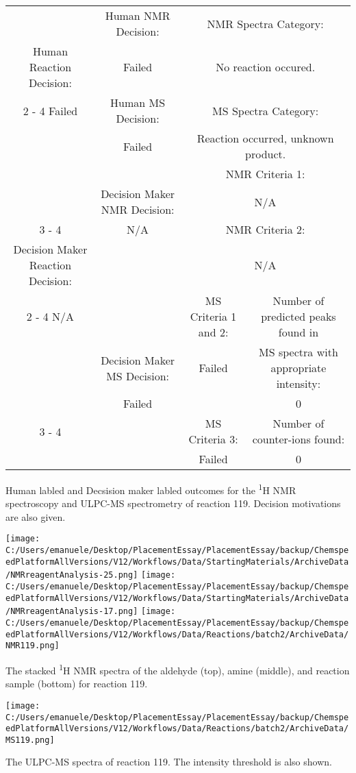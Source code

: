 \documentclass{article}%
\begin{document}
\begin{Decision Table}[H]%
\begin{tabular}{|c|c|c|c|}%
\hline%
&Human NMR Decision:&\multicolumn{2}{|c|}{NMR Spectra Category:}\\%
Human Reaction Decision:&Failed&\multicolumn{2}{|c|}{No reaction occured.}\\%
\cline{2%
-%
4}%
Failed&Human MS Decision:&\multicolumn{2}{|c|}{MS Spectra Category:}\\%
&Failed&\multicolumn{2}{|c|}{Reaction occurred, unknown product.}\\%
\hline%
&&\multicolumn{2}{|c|}{NMR Criteria 1:}\\%
&Decision Maker NMR Decision:&\multicolumn{2}{|c|}{N/A}\\%
\cline{3%
-%
4}%
&N/A&\multicolumn{2}{|c|}{NMR Criteria 2:}\\%
Decision Maker Reaction Decision:&&\multicolumn{2}{|c|}{N/A}\\%
\cline{2%
-%
4}%
N/A&&MS Criteria 1 and 2:&Number of predicted peaks found in\\%
&Decision Maker MS Decision:&Failed&MS spectra with appropriate intensity:\\%
&Failed&&0\\%
\cline{3%
-%
4}%
&&MS Criteria 3:&Number of counter{-}ions found:\\%
&&Failed&0\\%
\hline%
\end{tabular}%
\caption{Human labled and Decsision maker labled outcomes for the \textsuperscript{1}H NMR spectroscopy and ULPC-MS spectrometry of reaction 119. Decision motivations are also given.}%
\end{Decision Table}%
\begin{NMR Spectra}[H]%
\begin{center}%
\texttt{[image: C:/Users/emanuele/Desktop/PlacementEssay/PlacementEssay/backup/ChemspeedPlatformAllVersions/V12/Workflows/Data/StartingMaterials/ArchiveData/NMRreagentAnalysis-25.png]}\hfill%
\texttt{[image: C:/Users/emanuele/Desktop/PlacementEssay/PlacementEssay/backup/ChemspeedPlatformAllVersions/V12/Workflows/Data/StartingMaterials/ArchiveData/NMRreagentAnalysis-17.png]}\hfill%
\texttt{[image: C:/Users/emanuele/Desktop/PlacementEssay/PlacementEssay/backup/ChemspeedPlatformAllVersions/V12/Workflows/Data/Reactions/batch2/ArchiveData/NMR119.png]}\hfill%
\end{center}%
\caption{The stacked \textsuperscript{1}H NMR spectra of the aldehyde (top), amine (middle), and reaction sample (bottom) for reaction 119.}%
\end{NMR Spectra}%
\begin{MS Spectra}[H]%
\begin{center}%
\texttt{[image: C:/Users/emanuele/Desktop/PlacementEssay/PlacementEssay/backup/ChemspeedPlatformAllVersions/V12/Workflows/Data/Reactions/batch2/ArchiveData/MS119.png]}\hfill%
\end{center}%
\caption{The ULPC-MS spectra of reaction 119. The intensity threshold is also shown.}%
\end{MS Spectra}%
\end{document}
